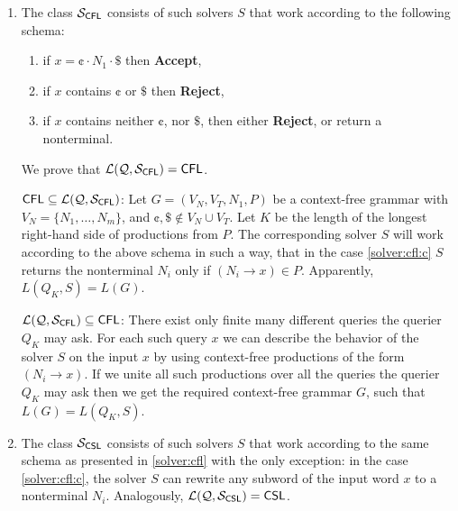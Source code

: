 \begin{enumerate}
\item\label{solver:cfl}
The class $\mathcal{S}_{\textsf{CFL}}$ consists of such solvers $S$ that work according to the following schema:
\begin{enumerate}
\item \label{solver:cfl:a}
      if $x = \cent \cdot N_1 \cdot \$$ then \textbf{Accept},
\item \label{solver:cfl:b}
      if $x$ contains $\cent$ or $\$$ then \textbf{Reject},
\item \label{solver:cfl:c}
      if $x$ contains neither $\cent$, nor $\$$, then either
      \textbf{Reject}, or return a nonterminal.
\end{enumerate}
We prove that ${\cal L}(\mathcal{Q}, \mathcal{S}_{\textsf{CFL}}) = \textup{\sf CFL}$.

$\textup{\sf CFL} \subseteq {\cal L}(\mathcal{Q}, \mathcal{S}_{\textsf{CFL}})$: Let $G = (V_N, V_T, N_1, P)$ be a context-free grammar with $V_N = \{N_1, \ldots, N_m\}$, and $\cent, \$ \notin V_N \cup V_T$. Let $K$ be the length of the longest right-hand side of productions from $P$. The corresponding solver $S$ will work according to the above schema in such a way, that in the case \ref{solver:cfl:c} $S$ returns the nonterminal $N_i$ only if $(N_i \to x) \in P$. Apparently, $L(Q_K, S) = L(G)$.

${\cal L}(\mathcal{Q}, \mathcal{S}_{\textsf{CFL}}) \subseteq \textup{\sf CFL}$: There exist only finite many different queries the querier $Q_K$ may ask. For each such query $x$ we can describe the behavior of the solver $S$ on the input $x$ by using context-free productions of the form $(N_i \to x)$. If we unite all such productions over all the queries the querier $Q_K$ may ask then we get the required context-free grammar $G$, such that $L(G) = L(Q_K, S)$.

\item\label{solver:csl}
The class $\mathcal{S}_{\textsf{CSL}}$ consists of such solvers $S$ that work according to the same schema as presented in \ref{solver:cfl} with the only exception: in the case \ref{solver:cfl:c}, the solver $S$ can rewrite any subword of the input word $x$ to a nonterminal $N_i$. Analogously, ${\cal L}(\mathcal{Q}, \mathcal{S}_{\textsf{CSL}}) = \textup{\sf CSL}$.
\end{enumerate}

